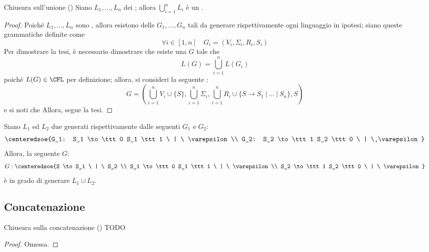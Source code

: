 \documentclass[a4paper, 12pt]{report}
\begin{document}
    \begin{framedprop}{Chiusura sull'unione (\CFL)}
        Siano $L_1, \ldots, L_n$ dei \CFL; allora $\displaystyle \bigcup_{i =1}^n{L_i}$ è un \CFL.
    \end{framedprop}

    \begin{proof}
        Poiché $L_1, \ldots, L_n$ sono \CFL, allora esistono delle \CFG $G_1, \ldots, G_n$ tali da generare rispettivamente ogni linguaggio in ipotesi; siano queste grammatiche definite come $$\forall i \in [1, n] \quad G_i = (V_i, \Sigma_i, R_i, S_i)$$ Per dimostrare la tesi, è necessario dimostrare che esiste una \CFG $G$ tale che $$L(G) = \bigcup_{i = 1}^n{L(G_i)}$$ poiché $L(G)\in \mathrm{\CFL}$ per definizione; allora, si consideri la seguente \CFG: $$\displaystyle G = \left( \bigcup_{i = 1}^n{V_i} \cup \{S\}, \bigcup_{i = 1}^n{\Sigma_i}, \bigcup_{i = 1}^n{R_i} \cup \{S \rightarrow S_1 \ | \ \ldots \ | \ S_n\}, S \right)$$ e si noti che  Allora, segue la tesi.
    \end{proof}

    \begin{example}
        Siano $L_1$ ed $L_2$ due \CFL generati rispettivamente dalle seguenti \CFG $G_1$ e $G_2$: $$\centeredsoe{G_1: S_1 \to \ttt 0 S_1 \ttt 1 \ | \ \varepsilon \\ G_2: S_2 \to \ttt 1 S_2 \ttt 0 \ | \ \varepsilon}$$ Allora, la seguente \CFG $G$: $$G: \centeredsoe{S \to S_1 \ | \ S_2 \\ S_1 \to \ttt 0 S_1 \ttt 1 \ | \ \varepsilon \\ S_2 \to \ttt 1 S_2 \ttt 0 \ | \ \varepsilon }$$ è in grado di generare $L_1 \cup L_2$.
    \end{example}

    \subsection{Concatenazione}

    \begin{framedprop}{Chiusura sulla concatenazione (\CFL)}
        TODO
    \end{framedprop}

    \begin{proof}
        Omessa.
    \end{proof}
\end{document}
